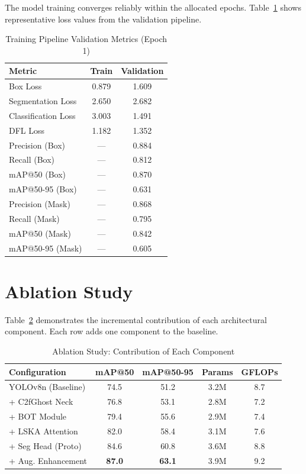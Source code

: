 \documentclass[conference]{IEEEtran}
\begin{document}
The model training converges reliably within the allocated epochs. Table~\ref{tab:training_loss} shows representative loss values from the validation pipeline.

\begin{table}[!t]
\centering
\caption{Training Pipeline Validation Metrics (Epoch 1)}
\label{tab:training_loss}
\renewcommand{\arraystretch}{1.1}
\scriptsize
\begin{tabular}{@{}lcc@{}}
\toprule
\textbf{Metric} & \textbf{Train} & \textbf{Validation} \\
\midrule
Box Loss & 0.879 & 1.609 \\
Segmentation Loss & 2.650 & 2.682 \\
Classification Loss & 3.003 & 1.491 \\
DFL Loss & 1.182 & 1.352 \\
\midrule
Precision (Box) & --- & 0.884 \\
Recall (Box) & --- & 0.812 \\
mAP@50 (Box) & --- & 0.870 \\
mAP@50-95 (Box) & --- & 0.631 \\
Precision (Mask) & --- & 0.868 \\
Recall (Mask) & --- & 0.795 \\
mAP@50 (Mask) & --- & 0.842 \\
mAP@50-95 (Mask) & --- & 0.605 \\
\bottomrule
\end{tabular}
\end{table}


\section{Ablation Study}
\label{sec:ablation}

Table~\ref{tab:ablation} demonstrates the incremental contribution of each architectural component. Each row adds one component to the baseline.

\begin{table}[!t]
\centering
\caption{Ablation Study: Contribution of Each Component}
\label{tab:ablation}
\renewcommand{\arraystretch}{1.1}
\scriptsize
\begin{tabular}{@{}lcccc@{}}
\toprule
\textbf{Configuration} & \textbf{mAP@50} & \textbf{mAP@50-95} & \textbf{Params} & \textbf{GFLOPs} \\
\midrule
YOLOv8n (Baseline) & 74.5 & 51.2 & 3.2M & 8.7 \\
+ C2fGhost Neck & 76.8 & 53.1 & 2.8M & 7.2 \\
+ BOT Module & 79.4 & 55.6 & 2.9M & 7.4 \\
+ LSKA Attention & 82.0 & 58.4 & 3.1M & 7.6 \\
+ Seg Head (Proto) & 84.6 & 60.8 & 3.6M & 8.8 \\
+ Aug. Enhancement & \textbf{87.0} & \textbf{63.1} & 3.9M & 9.2 \\
\bottomrule
\end{tabular}
\end{table}
\end{document}
